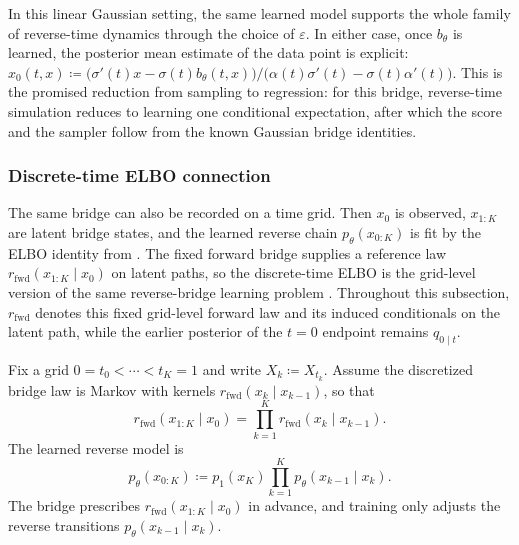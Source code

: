In this linear Gaussian setting, the same learned model supports the whole family of reverse-time dynamics through the choice of \(\varepsilon\).
In either case, once $b_\theta$ is learned, the posterior mean estimate of the data point is explicit:
$\hat x_0(t,x)\coloneqq \bigl(\sigma'(t)x-\sigma(t)b_\theta(t,x)\bigr)\big/\bigl(\alpha(t)\sigma'(t)-\sigma(t)\alpha'(t)\bigr)$.
This is the promised reduction from sampling to regression:
for this bridge, reverse-time simulation reduces to learning one conditional expectation, after which the score and the sampler follow from the known Gaussian bridge identities.

\subsubsection{Discrete-time ELBO connection}
\label{subsubsec:diffusion-elbo}

The same bridge can also be recorded on a time grid.
Then \(x_0\) is observed, \(x_{1:K}\) are latent bridge states, and the learned reverse chain \(p_\theta(x_{0:K})\) is fit by the ELBO identity from .
The fixed forward bridge supplies a reference law \(r_{\mathrm{fwd}}(x_{1:K}\mid x_0)\) on latent paths, so the discrete-time ELBO is the grid-level version of the same reverse-bridge learning problem \citep[\S3.5, eqs.~(11)--(12)]{kingma_salimans_poole_ho_2021_variational_diffusion}.
Throughout this subsection, \(r_{\mathrm{fwd}}\) denotes this fixed grid-level forward law and its induced conditionals on the latent path, while the earlier posterior of the \(t=0\) endpoint remains \(q_{0\mid t}\).

Fix a grid \(0=t_0<\cdots<t_K=1\) and write \(X_k\coloneqq X_{t_k}\).
Assume the discretized bridge law is Markov with kernels \(r_{\mathrm{fwd}}(x_k\mid x_{k-1})\), so that
\[
  r_{\mathrm{fwd}}(x_{1:K}\mid x_0)
  =
  \prod_{k=1}^K r_{\mathrm{fwd}}(x_k\mid x_{k-1}).
\]
The learned reverse model is
\[
  p_\theta(x_{0:K})
  \coloneqq
  p_1(x_K)\prod_{k=1}^K p_\theta(x_{k-1}\mid x_k).
\]
The bridge prescribes \(r_{\mathrm{fwd}}(x_{1:K}\mid x_0)\) in advance, and training only adjusts the reverse transitions \(p_\theta(x_{k-1}\mid x_k)\).

